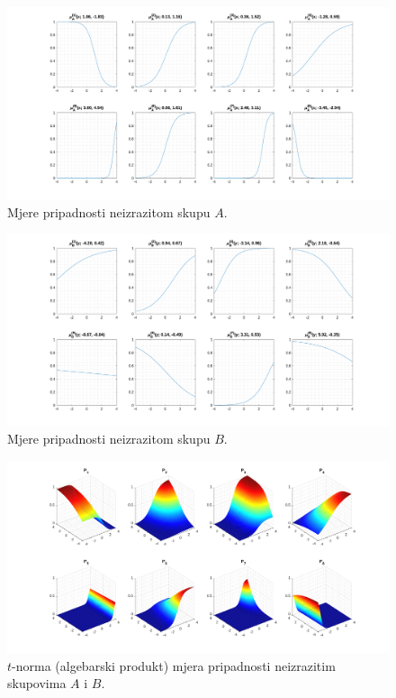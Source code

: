 \documentclass[12pt, a4paper]{article}
\begin{document}
\begin{figure}[H]
  \centering
  \includegraphics[width=\linewidth]{mem_A.pdf}
  \caption{Mjere pripadnosti neizrazitom skupu $A$.}
\end{figure}

\begin{figure}[H]
  \centering
  \includegraphics[width=\linewidth]{mem_B.pdf}
  \caption{Mjere pripadnosti neizrazitom skupu $B$.}
\end{figure}

\begin{figure}[H]
  \centering
  \includegraphics[width=\linewidth]{P.pdf}
  \caption{$t$-norma (algebarski produkt) mjera pripadnosti neizrazitim skupovima $A$ i $B$.}
\end{figure}
\end{document}
